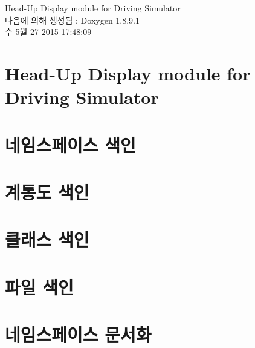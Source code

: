 \documentclass[twoside]{book}
\newcommand{\+}{\discretionary{\mbox{\scriptsize$\hookleftarrow$}}{}{}}
\newcommand{\clearemptydoublepage}{%
  \newpage{\pagestyle{empty}\cleardoublepage}%
}
\begin{document}
\hypersetup{pageanchor=false,
             bookmarks=true,
             bookmarksnumbered=true,
             pdfencoding=unicode
            }
\begin{titlepage}
\vspace*{7cm}
\begin{center}%
{\Large Head-\/\+Up Display module for Driving Simulator }\\
\vspace*{1cm}
{\large 다음에 의해 생성됨 \+:  Doxygen 1.8.9.1}\\
\vspace*{0.5cm}
{\small 수 5월 27 2015 17:48:09}\\
\end{center}
\end{titlepage}
\clearemptydoublepage
\tableofcontents
\clearemptydoublepage
{}
\hypersetup{pageanchor=true}

\chapter{Head-\/\+Up Display module for Driving Simulator}
\label{index}\hypertarget{index}{}
\chapter{네임스페이스 색인}

\chapter{계통도 색인}

\chapter{클래스 색인}

\chapter{파일 색인}

\chapter{네임스페이스 문서화}











\end{document}
